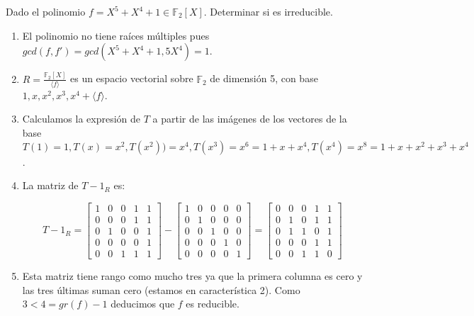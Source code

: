 \begin{example}
Dado el polinomio $f = X^5+X^4+1 \in \mathbb{F}_2[X]$. Determinar si es irreducible. 

\begin{enumerate}
\item El polinomio no tiene raíces múltiples pues $gcd(f,f') = gcd(X^5+X^4+1, 5X^4) = 1$. 

\item $R = \frac{\mathbb{F}_2[X]}{\langle f \rangle}$ es un espacio vectorial sobre $\mathbb{F}_2$ de dimensión 5, con base $1,x,x^2,x^3,x^4 + \langle f \rangle$.

\item Calculamos la expresión de $T$ a partir de las imágenes de los vectores de la base $T(1) = 1,T(x) = x^2,T(x^2) ) = x^4,T(x^3) = x^6 = 1+x+x^4,T(x^4) = x^8 = 1+x+x^2+x^3+x^4$. 

\item La matriz de $T - 1_R$ es:

\[
T - 1_R =
  \begin{bmatrix}
    1 & 0 & 0 & 1 & 1 \\
    0 & 0 & 0 & 1 & 1 \\
    0 & 1 & 0 & 0 & 1 \\
    0 & 0 & 0 & 0 & 1 \\
    0 & 0 & 1 & 1 & 1 
  \end{bmatrix}
  - \begin{bmatrix}
      1 & 0 & 0 & 0 & 0 \\
      0 & 1 & 0 & 0 & 0 \\
      0 & 0 & 1 & 0 & 0 \\
      0 & 0 & 0 & 1 & 0 \\
      0 & 0 & 0 & 0 & 1 
    \end{bmatrix} 
    = 
    \begin{bmatrix}
        0 & 0 & 0 & 1 & 1 \\
        0 & 1 & 0 & 1 & 1 \\
        0 & 1 & 1 & 0 & 1 \\
        0 & 0 & 0 & 1 & 1 \\
        0 & 0 & 1 & 1 & 0 
      \end{bmatrix}
\] 

\item Esta matriz tiene rango como mucho tres ya que la primera columna es cero y las tres últimas suman cero (estamos en característica 2). Como $3 < 4 = gr(f) - 1$ deducimos que $f$ es reducible. 
\end{enumerate}
\end{example}





